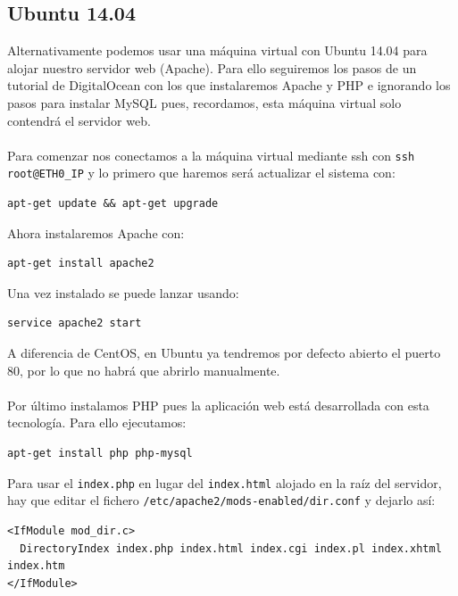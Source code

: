 \subsection{Ubuntu 14.04}

Alternativamente podemos usar una máquina virtual con Ubuntu 14.04 para alojar nuestro servidor web (Apache). Para ello seguiremos los pasos de un tutorial de DigitalOcean \cite{InstallLAMPUbuntu14.04} con los que instalaremos Apache y PHP e ignorando los pasos para instalar MySQL pues, recordamos, esta máquina virtual solo contendrá el servidor web.
\\ \\
Para comenzar nos conectamos a la máquina virtual mediante ssh con \texttt{ssh root@ETH0\_IP} y lo primero que haremos será actualizar el sistema con:

\begin{lstlisting}
apt-get update && apt-get upgrade
\end{lstlisting}

Ahora instalaremos Apache con:

\begin{lstlisting}
apt-get install apache2
\end{lstlisting}

Una vez instalado se puede lanzar usando:

\begin{lstlisting}
service apache2 start
\end{lstlisting}

A diferencia de CentOS, en Ubuntu ya tendremos por defecto abierto el puerto 80, por lo que no habrá que abrirlo manualmente.
\\ \\
Por último instalamos PHP pues la aplicación web está desarrollada con esta tecnología. Para ello ejecutamos:

\begin{lstlisting}
apt-get install php php-mysql
\end{lstlisting}

Para usar el \texttt{index.php} en lugar del \texttt{index.html} alojado en la raíz del servidor, hay que editar el fichero \texttt{/etc/apache2/mods-enabled/dir.conf} y dejarlo así:

\begin{lstlisting}
<IfModule mod_dir.c>
  DirectoryIndex index.php index.html index.cgi index.pl index.xhtml index.htm
</IfModule>
\end{lstlisting}


